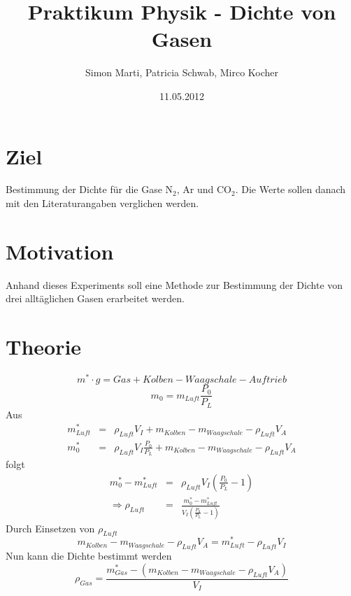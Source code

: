 \documentclass[12pt,a4paper]{article}
\title{Praktikum Physik - Dichte von Gasen}
\author{Simon Marti, Patricia Schwab, Mirco Kocher}
\date{11.05.2012}
\begin{document}
\maketitle

\section*{Ziel}
Bestimmung der Dichte f\"ur die Gase N$_2$, Ar und CO$_2$. Die Werte sollen danach mit den Literaturangaben verglichen werden.

\section*{Motivation}
Anhand dieses Experiments soll eine Methode zur Bestimmung der Dichte von drei allt\"aglichen Gasen erarbeitet werden.

\newpage
\section*{Theorie}
\begin{equation}
m^* \cdot g = Gas + Kolben - Waagschale - Auftrieb
\end{equation}
\begin{equation}
m_0 = m_{Luft} \frac{P_0}{P_L}
\end{equation}
Aus
\begin{eqnarray}
m^*_{Luft} & = & \rho _{Luft} V_I + m_{Kolben} - m_{Waagschale} - \rho_{Luft} V_A \\
m^*_0 & = & \rho_{Luft} V_I \frac{P_0}{P_L} + m_{Kolben} - m_{Waagschale} - \rho_{Luft} V_A 
\end{eqnarray}
folgt
\begin{eqnarray}
m^*_0 - m^*_{Luft} & = & \rho_{Luft}V_I \left( \frac{P_0}{P_L}-1\right) \\
\Rightarrow \rho_{Luft} & = & \frac{m^*_0 - m^*_{Luft}}{V_I \left( \frac{P_0}{P_L}-1\right)} 
\end{eqnarray}
Durch Einsetzen von $\rho_{Luft}$
\begin{equation}
m_{Kolben} - m_{Waagschale} - \rho_{Luft} V_A = m^*_{Luft} - \rho _{Luft} V_I
\end{equation}
Nun kann die Dichte bestimmt werden
\begin{equation}
\rho _{Gas} = \frac{m^*_{Gas} - (m_{Kolben} - m_{Waagschale} - \rho_{Luft} V_A)}{V_I}
\end{equation}
\end{document}
